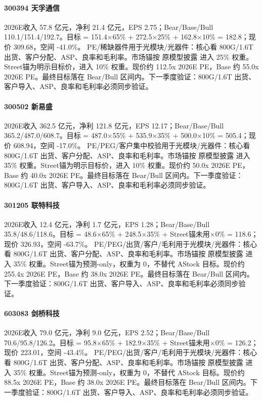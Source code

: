 \paragraph{300394 天孚通信} 2026E收入 57.8 亿元，净利 21.4 亿元，EPS 2.75；Bear/Base/Bull 110.1/151.4/192.7。目标 = 151.4×65\% + 272.5×25\% + 162.8×10\% = 182.8；现价 309.68，空间 -41.0\%。 PE/稀缺器件用于光模块/光器件：核心看 800G/1.6T 出货、客户分配、ASP、良率和毛利率。市场锚按 原模型披露 进入 25\% 权重。Street锚为明示目标价，进入 10\% 权重。现价约 112.5x 2026E PE，Base 约 55.0x 2026E PE。最终目标落在 Bear/Bull 区间内。下一季度验证：800G/1.6T 出货、客户导入、ASP、良率和毛利率必须同步验证。
\paragraph{300502 新易盛} 2026E收入 362.5 亿元，净利 121.8 亿元，EPS 12.17；Bear/Base/Bull 365.2/487.0/608.7。目标 = 487.0×55\% + 535.9×35\% + 500.0×10\% = 505.4；现价 608.94，空间 -17.0\%。 PE/PEG/客户集中校验用于光模块/光器件：核心看 800G/1.6T 出货、客户分配、ASP、良率和毛利率。市场锚按 原模型披露 进入 35\% 权重。Street锚为明示目标价，进入 10\% 权重。现价约 50.0x 2026E PE，Base 约 40.0x 2026E PE。最终目标落在 Bear/Bull 区间内。下一季度验证：800G/1.6T 出货、客户导入、ASP、良率和毛利率必须同步验证。
\paragraph{301205 联特科技} 2026E收入 12.4 亿元，净利 1.7 亿元，EPS 1.28；Bear/Base/Bull 35.8/48.6/118.6。目标 = 48.6×65\% + 248.5×35\% + Street锚未用×0\% = 118.6；现价 326.93，空间 -63.7\%。 PE/PEG/出货/客户/毛利用于光模块/光器件：核心看 800G/1.6T 出货、客户分配、ASP、良率和毛利率。市场锚按 原模型披露 进入 35\% 权重。Street锚为预测-only，权重为 0，不替代 AStock 目标。现价约 255.4x 2026E PE，Base 约 38.0x 2026E PE。最终目标落在 Bear/Bull 区间内。下一季度验证：800G/1.6T 出货、客户导入、ASP、良率和毛利率必须同步验证。
\paragraph{603083 剑桥科技} 2026E收入 79.0 亿元，净利 9.0 亿元，EPS 2.52；Bear/Base/Bull 70.6/95.8/126.2。目标 = 95.8×65\% + 182.9×35\% + Street锚未用×0\% = 126.2；现价 223.01，空间 -43.4\%。 PE/PEG/出货/客户/毛利用于光模块/光器件：核心看 800G/1.6T 出货、客户分配、ASP、良率和毛利率。市场锚按 原模型披露 进入 35\% 权重。Street锚为预测-only，权重为 0，不替代 AStock 目标。现价约 88.5x 2026E PE，Base 约 38.0x 2026E PE。最终目标落在 Bear/Bull 区间内。下一季度验证：800G/1.6T 出货、客户导入、ASP、良率和毛利率必须同步验证。
